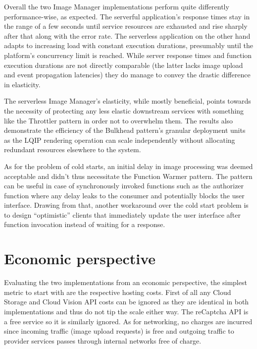 Overall the two Image Manager implementations perform quite differently performance-wise, as expected. The serverful application's response times stay in the range of a few seconds until service resources are exhausted and rise sharply after that along with the error rate. The serverless application on the other hand adapts to increasing load with constant execution durations, presumably until the platform's concurrency limit is reached. While server response times and function execution durations are not directly comparable (the latter lacks image upload and event propagation latencies) they do manage to convey the drastic difference in elasticity.

The serverless Image Manager's elasticity, while mostly beneficial, points towards the necessity of protecting any less elastic downstream services with something like the Throttler pattern in order not to overwhelm them. The results also demonstrate the efficiency of the Bulkhead pattern's granular deployment units as the LQIP rendering operation can scale independently without allocating redundant resources elsewhere to the system.

As for the problem of cold starts, an initial delay in image processing was deemed acceptable and didn't thus necessitate the Function Warmer pattern. The pattern can be useful in case of synchronously invoked functions such as the authorizer function where any delay leaks to the consumer and potentially blocks the user interface. Drawing from that, another workaround over the cold start problem is to design ``optimistic'' clients that immediately update the user interface after function invocation instead of waiting for a response.

\section{Economic perspective}

Evaluating the two implementations from an economic perspective, the simplest metric to start with are the respective hosting costs. First of all any Cloud Storage and Cloud Vision API costs can be ignored as they are identical in both implementations and thus do not tip the scale either way. The reCaptcha API is a free service so it is similarly ignored. As for networking, no charges are incurred since incoming traffic (image upload requests) is free and outgoing traffic to provider services passes through internal networks free of charge.

